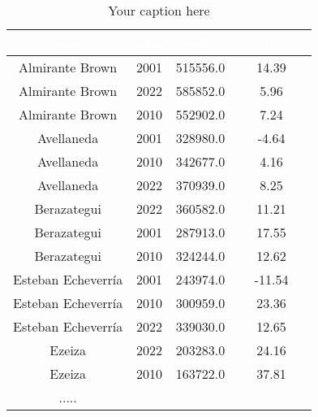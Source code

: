 \begin{table}[htb]
\centering
\begin{tabular}{|c|c|c|c|}
\hline
\textbf{\cellcolor[rgb]{0,0.231,0.427}\textcolor{white}{nam}} & \textbf{\cellcolor[rgb]{0,0.231,0.427}\textcolor{white}{anio}} & \textbf{\cellcolor[rgb]{0,0.231,0.427}\textcolor{white}{pob}} & \textbf{\cellcolor[rgb]{0,0.231,0.427}\textcolor{white}{$growth_ratio$}} & \\ \hline
Almirante Brown & 2001 & 515556.0 & 14.39 \\
Almirante Brown & 2022 & 585852.0 & 5.96 \\
Almirante Brown & 2010 & 552902.0 & 7.24 \\
Avellaneda & 2001 & 328980.0 & -4.64 \\
Avellaneda & 2010 & 342677.0 & 4.16 \\
Avellaneda & 2022 & 370939.0 & 8.25 \\
Berazategui & 2022 & 360582.0 & 11.21 \\
Berazategui & 2001 & 287913.0 & 17.55 \\
Berazategui & 2010 & 324244.0 & 12.62 \\
Esteban Echeverría & 2001 & 243974.0 & -11.54 \\
Esteban Echeverría & 2010 & 300959.0 & 23.36 \\
Esteban Echeverría & 2022 & 339030.0 & 12.65 \\
Ezeiza & 2022 & 203283.0 & 24.16 \\
Ezeiza & 2010 & 163722.0 & 37.81 \\
.....&&& \\
\hline
\end{tabular}
\caption{Your caption here}
\label{tab:my_table}
\end{table}
